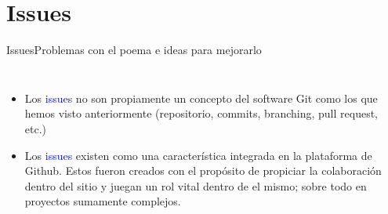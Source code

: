 \documentclass[10pt]{beamer}
\begin{document}
\section{Issues}

\begin{frame}{Issues}{Problemas con el poema e ideas para mejorarlo}
\begin{block}{}

\begin{columns}[c]
\column{2.3in}
\vspace{-0.2in}
\begin{itemize}
        \item Los \textcolor{blue}{issues} no son propiamente un concepto del software Git como los que hemos visto anteriormente (repositorio, commits, branching, pull request, etc.)\\
        
        \item Los \textcolor{blue}{issues} existen como una característica integrada en la plataforma de Github. Estos fueron creados con el propósito de propiciar la colaboración dentro del sitio y juegan un rol vital dentro de el mismo; sobre todo en proyectos sumamente complejos.
\end{itemize}

\column{1.3in}
\end{columns}
    
\end{block}

\end{frame}
\end{document}
